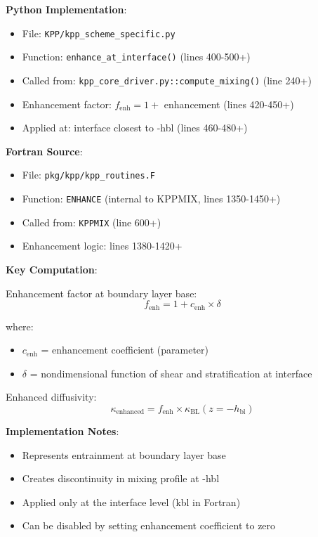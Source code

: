 \documentclass[11pt]{article}
\begin{document}
\textbf{Python Implementation}:
\begin{itemize}
    \item File: \verb|KPP/kpp_scheme_specific.py|
    \item Function: \verb|enhance_at_interface()| (lines 400-500+)
    \item Called from: \verb|kpp_core_driver.py::compute_mixing()| (line 240+)
    \item Enhancement factor: $f_{\text{enh}} = 1 + $ enhancement (lines 420-450+)
    \item Applied at: interface closest to -hbl (lines 460-480+)
\end{itemize}

\textbf{Fortran Source}:
\begin{itemize}
    \item File: \verb|pkg/kpp/kpp_routines.F|
    \item Function: \verb|ENHANCE| (internal to KPPMIX, lines 1350-1450+)
    \item Called from: \verb|KPPMIX| (line 600+)
    \item Enhancement logic: lines 1380-1420+
\end{itemize}

\textbf{Key Computation}:

Enhancement factor at boundary layer base:
\begin{equation}
f_{\text{enh}} = 1 + c_{\text{enh}} \times \delta
\end{equation}

where:
\begin{itemize}
    \item $c_{\text{enh}}$ = enhancement coefficient (parameter)
    \item $\delta$ = nondimensional function of shear and stratification at interface
\end{itemize}

Enhanced diffusivity:
\begin{equation}
\kappa_{\text{enhanced}} = f_{\text{enh}} \times \kappa_{\text{BL}}(z = -h_{\text{bl}})
\end{equation}

\textbf{Implementation Notes}:
\begin{itemize}
    \item Represents entrainment at boundary layer base
    \item Creates discontinuity in mixing profile at -hbl
    \item Applied only at the interface level (kbl in Fortran)
    \item Can be disabled by setting enhancement coefficient to zero
\end{itemize}
\end{document}

